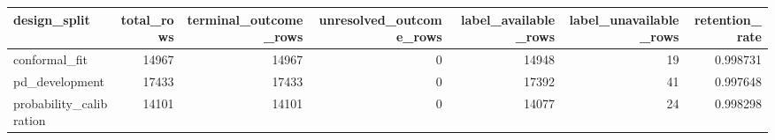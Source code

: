 \begin{tabular}{lrrrrrr}
\toprule
design\_split & total\_rows & terminal\_outcome\_rows & unresolved\_outcome\_rows & label\_available\_rows & label\_unavailable\_rows & retention\_rate \\
\midrule
conformal\_fit & 14967 & 14967 & 0 & 14948 & 19 & 0.998731 \\
pd\_development & 17433 & 17433 & 0 & 17392 & 41 & 0.997648 \\
probability\_calibration & 14101 & 14101 & 0 & 14077 & 24 & 0.998298 \\
\bottomrule
\end{tabular}
